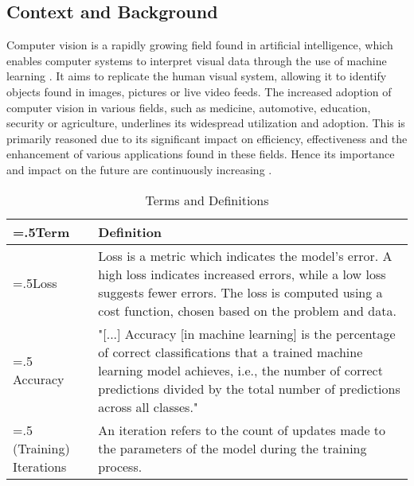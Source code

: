 \subsection{Context and Background}
Computer vision is a rapidly growing field found in artificial intelligence, which enables computer systems to interpret visual data through the use of machine learning \parencite[pp.~2--5]{Sultana2020}. It aims to replicate the human visual system, allowing it to identify objects found in images, pictures or live video feeds. The increased adoption of computer vision in various fields, such as medicine, automotive, education, security or agriculture, underlines its widespread utilization and adoption. This is primarily reasoned due to its significant impact on efficiency, effectiveness and the enhancement of various applications found in these fields. Hence its importance and impact on the future are continuously increasing \parencite[pp.~1--3, 85--95]{Szeliski2022}. 
\\
\begin{table}[h]
\centering
\begin{tabularx}{\textwidth}{|>{\hsize=.5\hsize}X|>{\hsize=1.5\hsize}X|}
\hline
\textbf{Term} & \textbf{Definition} \\
\hline
Loss & 
Loss is a metric which indicates the model's error. A high loss indicates increased errors, while a low loss suggests fewer errors. 
The loss is computed using a cost function, chosen based on the problem and data. \parencite{Baeldung2022}
\\
\hline
Accuracy &
"[...] Accuracy [in machine learning] is the percentage of correct classifications that a trained machine learning model achieves, i.e., 
the number of correct predictions divided by the total number of predictions across all classes." \parencite{Iguazio}
\\
\hline
(Training) Iterations & 
An iteration refers to the count of updates made to the parameters of the model during the training process. \parencite{Paperspace}
\\
\hline

\end{tabularx}
\caption{Terms and Definitions}
\label{tab:terms-and-definitions}
\end{table}

\newpage
